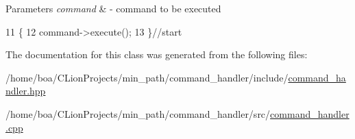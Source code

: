 \begin{DoxyParams}{Parameters}
{\em command} & -\/ command to be executed \\
\hline
\end{DoxyParams}

\begin{DoxyCode}
11                                                                    \{
12             command->execute();
13         \}\textcolor{comment}{//start}
\end{DoxyCode}


The documentation for this class was generated from the following files\+:\begin{DoxyCompactItemize}
\item 
/home/boa/\+C\+Lion\+Projects/min\+\_\+path/command\+\_\+handler/include/\hyperlink{a00018}{command\+\_\+handler.\+hpp}\item 
/home/boa/\+C\+Lion\+Projects/min\+\_\+path/command\+\_\+handler/src/\hyperlink{a00024}{command\+\_\+handler.\+cpp}\end{DoxyCompactItemize}
